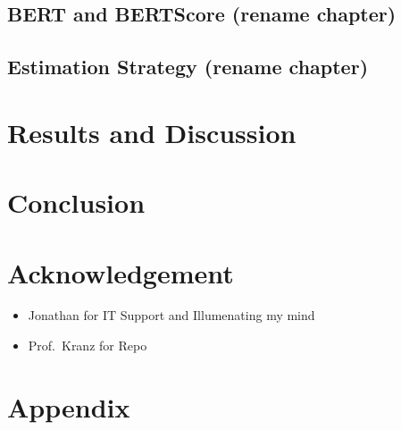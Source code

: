 \documentclass[
]{article}
\providecommand{\tightlist}{%
  \setlength{\itemsep}{0pt}\setlength{\parskip}{0pt}}\usepackage{longtable,booktabs,array}
\begin{document}
\subsection{BERT and BERTScore (rename
chapter)}\label{bert-and-bertscore-rename-chapter}

\subsection{Estimation Strategy (rename
chapter)}\label{estimation-strategy-rename-chapter}

\section{Results and Discussion}\label{results-and-discussion}

\section{Conclusion}\label{conclusion}

\section{Acknowledgement}\label{acknowledgement}

\begin{itemize}
\tightlist
\item
  Jonathan for IT Support and Illumenating my mind
\item
  Prof.~Kranz for Repo
\end{itemize}

\section*{Appendix}\label{appendix}
\end{document}
